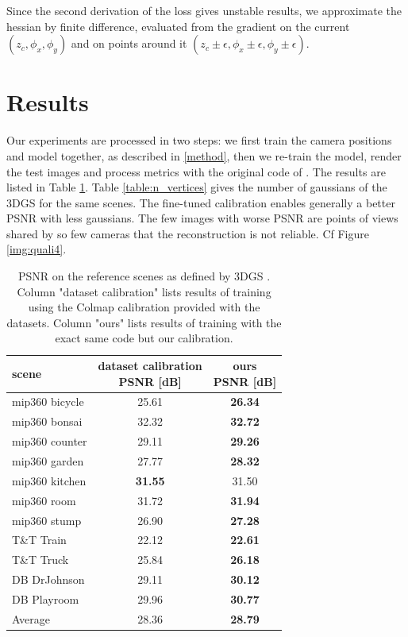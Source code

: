 \documentclass[a4paper,twoside,french]{article}
\begin{document}
Since the second derivation of the loss gives unstable results, we approximate the hessian by finite difference, evaluated from the gradient on the current
$(z_c,\phi_x,\phi_y)$ and on points around it $(z_c \pm \epsilon, \phi_x \pm \epsilon, \phi_y \pm \epsilon)$.

\section{Results}

Our experiments are processed in two steps: we first train the camera positions and model together, as described in \ref{method},
then we re-train the model, render the test images and process metrics with the original code of \cite{kerbl20233d}.
The results are listed in Table \ref{table:results}. 
Table \ref{table:n_vertices} gives the number of gaussians of the 3DGS \cite{kerbl20233d} for the same scenes.
The fine-tuned calibration enables generally a better PSNR with less gaussians.
The few images with worse PSNR are points of views shared by so few cameras that the reconstruction is not reliable. Cf Figure \ref{img:quali4}.

\begin{table}[h]
  \small
	\begin{center}
		{
		\begin{tabular}{|p{3cm}|c|c|}
			\hline
			scene & \shortstack{dataset calibration \\ PSNR [dB]} & \shortstack{ours \\ PSNR [dB]} \\
			\hline
			mip360 bicycle & 25.61 & \textbf{26.34} \\
			mip360 bonsai & 32.32 & \textbf{32.72} \\
			mip360 counter & 29.11 & \textbf{29.26} \\
			mip360 garden & 27.77 & \textbf{28.32} \\
			mip360 kitchen & \textbf{31.55} & 31.50 \\
			mip360 room & 31.72 & \textbf{31.94} \\
			mip360 stump & 26.90 & \textbf{27.28} \\
			T\&T Train & 22.12 & \textbf{22.61} \\
			T\&T Truck & 25.84 & \textbf{26.18} \\
			DB DrJohnson & 29.11 & \textbf{30.12} \\
			DB Playroom & 29.96 & \textbf{30.77} \\
			\hline
			Average & 28.36 & \textbf{28.79} \\
			\hline
			\end{tabular}
			}
			\caption{PSNR on the reference scenes as defined by 3DGS \cite{kerbl20233d}.
			Column "dataset calibration" lists results of training using the Colmap calibration provided with the datasets.
			Column "ours" lists results of training with the exact same code but our calibration.}
			\label{table:results}
		\end{center}
	\end{table}
	
\end{document}
